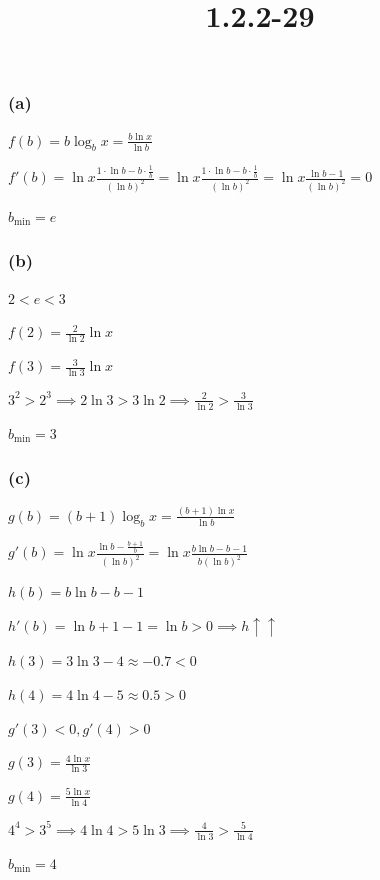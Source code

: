 \documentclass{article}
\title{1.2.2-29}
\begin{document}
\maketitle

\subsubsection*{(a)}

\( f(b) = b \log_b{x} = \frac{b\ln{x}}{\ln{b}} \)

\( f'(b) = \ln{x} \frac{1 \cdot \ln{b} - b \cdot \frac{1}{b}}{(\ln{b})^2} = \ln{x} \frac{1 \cdot \ln{b} - b \cdot \frac{1}{b}}{(\ln{b})^2} = \ln{x} \frac{\ln{b} - 1}{(\ln{b})^2} = 0 \)

\( b_{\min} = e \)

\subsubsection*{(b)}

\( 2 < e < 3 \)

\( f(2) = \frac{2}{\ln{2}}\ln{x} \)

\( f(3) = \frac{3}{\ln{3}}\ln{x} \)

\( 3^2 > 2^3 \implies 2\ln{3} > 3\ln{2} \implies \frac{2}{\ln{2}} > \frac{3}{\ln{3}} \)

\( b_{\min} = 3 \)

\subsubsection*{(c)}

\( g(b) = (b+1)\log_b{x} = \frac{(b+1)\ln{x}}{\ln{b}} \)

\( g'(b)=\ln{x}\frac{\ln{b} - \frac{b+1}{b}}{(\ln{b})^2} = \ln{x}\frac{b\ln{b} - b - 1}{b(\ln{b})^2} \)

\( h(b) = b\ln{b} - b - 1 \)

\( h'(b) = \ln{b} + 1 - 1 = \ln{b} > 0 \implies h \uparrow \uparrow \)

\( h(3) = 3\ln{3} - 4 \approx -0.7 < 0 \)

\( h(4) = 4\ln{4} - 5 \approx 0.5 > 0 \)

\( g'(3) < 0, g'(4) > 0 \)

\( g(3) = \frac{4\ln{x}}{\ln{3}} \)

\( g(4) = \frac{5\ln{x}}{\ln{4}} \)

\( 4^4 > 3^5 \implies 4 \ln{4} > 5 \ln{3} \implies \frac{4}{\ln{3}} > \frac{5}{\ln{4}} \)

\( b_{\min} = 4 \)
\end{document}
